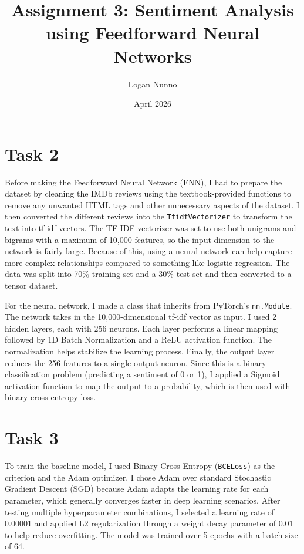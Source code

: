 \documentclass{article}
\title{Assignment 3: Sentiment Analysis using Feedforward Neural
Networks}
\author{Logan Nunno }
\date{April 2026}
\begin{document}
\maketitle

\section{Task 2}
Before making the Feedforward Neural Network (FNN), I had to prepare the dataset by cleaning the IMDb reviews using the textbook-provided functions to remove any unwanted HTML tags and other unnecessary aspects of the dataset. I then converted the different reviews into the \texttt{TfidfVectorizer} to transform the text into tf-idf vectors. The TF-IDF vectorizer was set to use both unigrams and bigrams with a maximum of 10,000 features, so the input dimension to the network is fairly large. Because of this, using a neural network can help capture more complex relationships compared to something like logistic regression. The data was split into 70\% training set and a 30\% test set and then converted to a tensor dataset.

For the neural network, I made a class that inherits from PyTorch's \texttt{nn.Module}. The network takes in the 10,000-dimensional tf-idf vector as input. I used 2 hidden layers, each with 256 neurons. Each layer performs a linear mapping followed by 1D Batch Normalization and a ReLU activation function. The normalization helps stabilize the learning process. Finally, the output layer reduces the 256 features to a single output neuron. Since this is a binary classification problem (predicting a sentiment of 0 or 1), I applied a Sigmoid activation function to map the output to a probability, which is then used with binary cross-entropy loss.

\section{Task 3}
To train the baseline model, I used Binary Cross Entropy (\texttt{BCELoss}) as the criterion and the Adam optimizer. I chose Adam over standard Stochastic Gradient Descent (SGD) because Adam adapts the learning rate for each parameter, which generally converges faster in deep learning scenarios. After testing multiple hyperparameter combinations, I selected a learning rate of $0.00001$ and applied L2 regularization through a weight decay parameter of $0.01$ to help reduce overfitting. The model was trained over 5 epochs with a batch size of 64.
\end{document}
